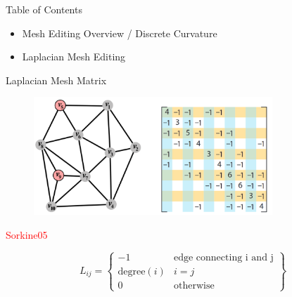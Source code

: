 \documentclass{beamer}
\begin{document}
\begin{frame}{Table of Contents}
\begin{itemize}[label=$\vartriangleright$]
	\item Mesh Editing Overview / Discrete Curvature
\end{itemize}

\begin{itemize}[label=$\blacktriangleright$]
	\item Laplacian Mesh Editing
\end{itemize}
\end{frame}


\begin{frame}{Laplacian Mesh Matrix}

\begin{figure}[t]
    \includegraphics[width=0.8\textwidth]{Sorkine05_GraphLaplacian.png}
\end{figure}

\textcolor{red}{Sorkine05}

\[ L_{ij} = \left\{ \begin{array}{cc} -1 & \text{edge connecting i and j} \\ \text{degree}(i) & i = j \\ 0 & \text{otherwise} \end{array} \right\} \]

\end{frame}
\end{document}
